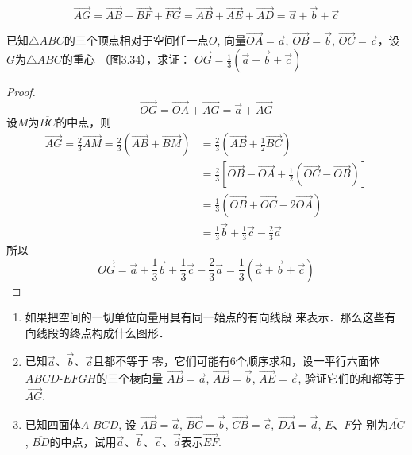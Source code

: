 \begin{solution}
\[\Vec{AG}=\Vec{AB}+\Vec{BF}+\Vec{FG}=\Vec{AB}+\Vec{AE}+\Vec{AD}=\vec{a}+\vec{b}+\vec{c}\]
\end{solution}

\begin{example}
    已知$\triangle ABC$的三个顶点相对于空间任一点$O$, 
 向量$\Vec{OA}=\vec{a}$, $\vec{OB}=\vec{b}$, $\Vec{OC}=\vec{c}$，设$G$为$\triangle ABC$的重心
    （图3.34），求证：
$\Vec{OG}=\frac{1}{3}\left(\vec{a}+\vec{b}+\vec{c}\right)$
\end{example}

\begin{figure}[htp]
    \centering
{}
    \caption{}
\end{figure}


\begin{proof}
\[\Vec{OG}=\Vec{OA}+\Vec{AG}=\vec{a}+\Vec{AG}\]
设$M$为$\overline{BC}$的中点，则
\[\begin{split}
\Vec{AG}=\frac{2}{3}\Vec{AM}=\frac{2}{3}\left(\Vec{AB}+\Vec{BM}\right)&=\frac{2}{3}\left(\Vec{AB}+\frac{1}{2}\Vec{BC}\right)\\
&=\frac{2}{3}\left[\Vec{OB}-\Vec{OA}+\frac{1}{2}\left(\Vec{OC}-\Vec{OB}\right)\right]\\
&=\frac{1}{3}\left(\Vec{OB}+\Vec{OC}-2\Vec{OA}\right)\\
&=\frac{1}{3}\vec{b}+\frac{1}{3}\vec{c}-\frac{2}{3}\vec{a}
\end{split}\]
所以
\[\Vec{OG}=\vec{a}+\frac{1}{3}\vec{b}+\frac{1}{3}\vec{c}-\frac{2}{3}\vec{a}=\frac{1}{3}\left(\vec{a}+\vec{b}+\vec{c}\right)\]
\end{proof}

\begin{ex}
    \begin{enumerate}
        \item 如果把空间的一切单位向量用具有同一始点的有向线段
        来表示．那么这些有向线段的终点构成什么图形．
\item 已知$\vec{a}$、$\vec{b}$、$\vec{c}$且都不等于
零，它们可能有6个顺序求和，设一平行六面体$ABCD$-$EFGH$的三个棱向量
$\Vec{AB}=\vec{a}$, $\Vec{AB}=\vec{b}$, $\Vec{AE}=\vec{c}$, 验证它们的和都等于$\Vec{AG}$.
\item 已知四面体$A$-$BCD$, 设
$\Vec{AB}=\vec{a}$, $\Vec{BC}=\vec{b}$, $\Vec{CB}=\vec{c}$, $\Vec{DA}=\vec{d}$, $E$、$F$分
别为$\overline{AC}$, $\overline{BD}$的中点，试用$\vec{a}$、$\vec{b}$、$\vec{c}$、$\vec{d}$表示$\Vec{EF}$.
    \end{enumerate}
\end{ex}


